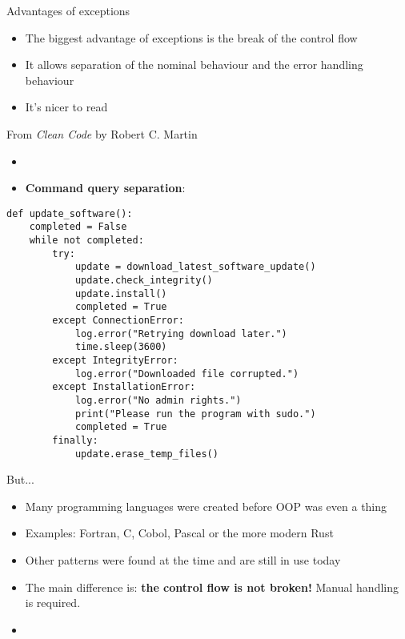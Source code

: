 \documentclass[aspectratio=169,14pt]{beamer}
\begin{document}
\begin{frame}{Advantages of exceptions}
    \begin{itemize}
        \item The biggest advantage of exceptions is the break of the control flow
        \item It allows separation of the nominal behaviour and the error handling behaviour
        \item It's nicer to read
    \end{itemize}
\end{frame}


\begin{frame}{From \textit{Clean Code} by Robert C. Martin}
    \begin{itemize}
        \item \textit{}
        \item \textbf{Command query separation}: \textit{}
    \end{itemize}
\end{frame}


\begin{frame}[fragile]{}
\begin{lstlisting}[style=pythonstyle]
def update_software():
    completed = False
    while not completed:
        try:
            update = download_latest_software_update()
            update.check_integrity()
            update.install()
            completed = True
        except ConnectionError:
            log.error("Retrying download later.")
            time.sleep(3600)
        except IntegrityError:
            log.error("Downloaded file corrupted.")
        except InstallationError:
            log.error("No admin rights.")
            print("Please run the program with sudo.")
            completed = True
        finally:
            update.erase_temp_files()
\end{lstlisting}
\end{frame}


\begin{frame}{But...}
    \begin{itemize}
        \item Many programming languages were created before OOP was even a thing
        \item Examples: Fortran, C, Cobol, Pascal or the more modern Rust
        \item Other patterns were found at the time and are still in use today
        \item The main difference is: \textbf{the control flow is not broken!} Manual handling is required.
        \item \textit{}
    \end{itemize}
\end{frame}
\end{document}
